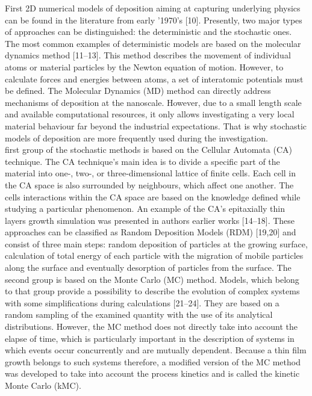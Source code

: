 \documentclass[journal,article,submit,pdftex,moreauthors]{Definitions/mdpi}
\begin{document}
First 2D numerical models of deposition aiming at capturing underlying physics can be found in the literature from early '1970's [10]. Presently, two major types of approaches can be distinguished: the deterministic and the stochastic ones. The most common examples of deterministic models are based on the molecular dynamics method [11–13]. This method describes the movement of individual atoms or material particles by the Newton equation of motion. However, to calculate forces and energies  between atoms, a set of interatomic potentials must be defined. The Molecular Dynamics (MD) method can directly address mechanisms of deposition at the nanoscale. However, due to a small length scale and available computational resources, it only allows investigating a very local material behaviour far beyond the industrial expectations. That is why stochastic models of deposition are more frequently used during the investigation.\\ 
 first group of the stochastic methods is based on the Cellular Automata (CA) technique. The CA technique's main idea is to divide a specific part of the material into one-, two-, or three-dimensional lattice of finite cells. Each cell in the CA space is also surrounded by neighbours, which affect one another. The cells interactions within the CA space are based on the knowledge defined while studying a particular phenomenon. An example of the CA's epitaxially thin layers growth simulation was presented in authors earlier works [14–18]. These approaches can be classified as Random Deposition Models (RDM) [19,20] and consist of three main steps: random deposition of particles at the growing surface, calculation of total energy of each particle with the migration of mobile particles along the surface and eventually desorption of particles from the surface.
The second group is based on the Monte Carlo (MC) method. Models, which belong to that group provide a possibility to describe the evolution of complex systems with some simplifications during calculations [21–24]. They are based on a random sampling of the examined quantity with the use of its analytical distributions. However, the MC method does not directly take into account the elapse of time, which is particularly important in the description of systems in which events occur concurrently and are mutually dependent. Because a thin film growth belongs to such systems therefore, a modified version of the MC method was developed to take into account the process kinetics and is called the kinetic Monte Carlo (kMC).\\
\end{document}
